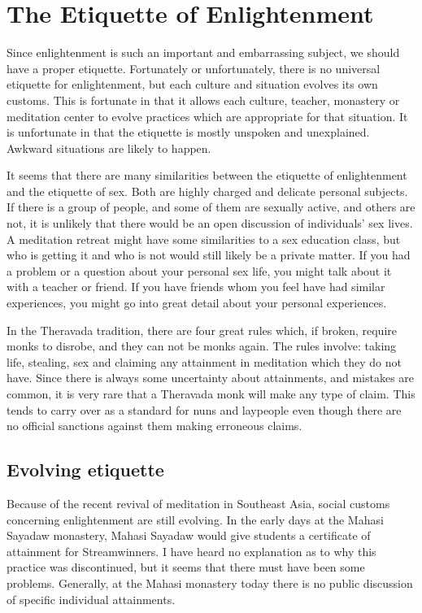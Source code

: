 \documentclass[a5paper,10pt,english]{book}
\begin{document}
\section{The Etiquette of Enlightenment}
\label{\detokenize{saints:the-etiquette-of-enlightenment}}
\sphinxAtStartPar
Since enlightenment is such an important and embarrassing subject, we
should have a proper etiquette. Fortunately or unfortunately, there is
no universal etiquette for enlightenment, but each culture and situation
evolves its own customs. This is fortunate in that it allows each
culture, teacher, monastery or meditation center to evolve practices
which are appropriate for that situation. It is unfortunate in that the
etiquette is mostly unspoken and unexplained. Awkward situations are
likely to happen.

\sphinxAtStartPar
It seems that there are many similarities between the etiquette of
enlightenment and the etiquette of sex. Both are highly charged and
delicate personal subjects. If there is a group of people, and some of
them are sexually active, and others are not, it is unlikely that there
would be an open discussion of individuals’ sex lives. A meditation
retreat might have some similarities to a sex education class, but who
is getting it and who is not would still likely be a private matter. If
you had a problem or a question about your personal sex life, you might
talk about it with a teacher or friend. If you have friends whom you
feel have had similar experiences, you might go into great detail about
your personal experiences.

\sphinxAtStartPar
In the Theravada tradition, there are four great rules which, if broken,
require monks to disrobe, and they can not be monks again. The rules
involve: taking life, stealing, sex and claiming any attainment in
meditation which they do not have. Since there is always some
uncertainty about attainments, and mistakes are common, it is very rare
that a Theravada monk will make any type of claim. This tends to carry
over as a standard for nuns and laypeople even though there are no
official sanctions against them making erroneous claims.


\subsection{Evolving etiquette}
\label{\detokenize{saints:evolving-etiquette}}
\sphinxAtStartPar
Because of the recent revival of meditation in Southeast Asia, social
customs concerning enlightenment are still evolving. In the early days
at the Mahasi Sayadaw monastery, Mahasi Sayadaw would give students a
certificate of attainment for Stream\sphinxhyphen{}winners. I have heard no
explanation as to why this practice was discontinued, but it seems that
there must have been some problems. Generally, at the Mahasi monastery
today there is no public discussion of specific individual attainments.
\end{document}
